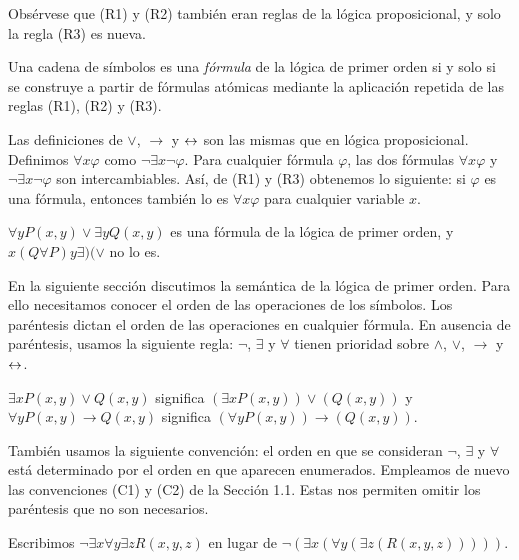 \message{ !name(main.tex)}\documentclass[12pt,a4paper]{book}
\begin{document}
    Obsérvese que (R1) y (R2) también eran reglas de la lógica proposicional, y solo la regla (R3) es nueva.

    \begin{definicion}\label{def:formula-fol}
        Una cadena de símbolos es una \textit{fórmula} de la lógica de primer orden si y solo si se construye a partir de
        fórmulas atómicas mediante la aplicación repetida de las reglas (R1), (R2) y (R3).
    \end{definicion}

    Las definiciones de $\vee$, $\rightarrow$ y $\leftrightarrow$ son las mismas que en lógica proposicional. Definimos $\forall x\varphi$
    como $\neg\exists x\neg\varphi$. Para cualquier fórmula $\varphi$, las dos fórmulas $\forall x\varphi$ y $\neg\exists x\neg\varphi$
    son intercambiables. Así, de (R1) y (R3) obtenemos lo siguiente: si $\varphi$ es una fórmula, entonces también lo es
    $\forall x\varphi$ para cualquier variable $x$.

    \begin{ejemplo}
        $\forall yP(x,y)\vee\exists yQ(x,y)$ es una fórmula de la lógica de primer orden, y $x(Q\forall P)y\exists)(\vee$ no
        lo es.
    \end{ejemplo}

    En la siguiente sección discutimos la semántica de la lógica de primer orden. Para ello necesitamos conocer el orden de
    las operaciones de los símbolos. Los paréntesis dictan el orden de las operaciones en cualquier fórmula. En ausencia de
    paréntesis, usamos la siguiente regla: $\neg$, $\exists$ y $\forall$ tienen prioridad sobre $\wedge$, $\vee$,
    $\rightarrow$ y $\leftrightarrow$.

    \begin{ejemplo}
        $\exists xP(x,y)\vee Q(x,y)$ significa $(\exists xP(x,y))\vee(Q(x,y))$ y $\forall yP(x,y)\rightarrow Q(x,y)$
        significa $(\forall yP(x,y))\rightarrow(Q(x,y))$.
    \end{ejemplo}

    También usamos la siguiente convención: el orden en que se consideran $\neg$, $\exists$ y $\forall$ está determinado por
    el orden en que aparecen enumerados. Empleamos de nuevo las convenciones (C1) y (C2) de la Sección 1.1. Estas nos
    permiten omitir los paréntesis que no son necesarios.

    \begin{ejemplo}
        Escribimos $\neg\exists x\forall y\exists zR(x,y,z)$ en lugar de $\neg(\exists x(\forall y(\exists z(R(x,y,z)))))$.
    \end{ejemplo}
\end{document}
